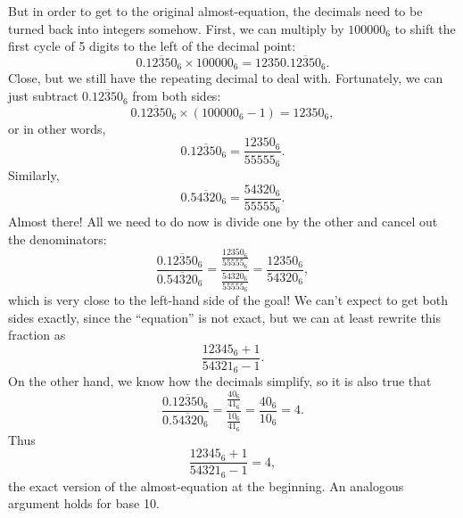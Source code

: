 \documentclass{article}
\begin{document}
But in order to get to the original almost-equation,
the decimals need to be turned back into integers somehow.
First, we can multiply by $100000_6$
to shift the first cycle of 5 digits to the left of the decimal point:
\[0.\overline{12350}_6 \times 100000_6 = 12350.\overline{12350}_6.\]
Close, but we still have the repeating decimal to deal with.
Fortunately, we can just subtract $0.\overline{12350}_6$ from both sides:
\[0.\overline{12350}_6 \times (100000_6-1) = 12350_6,\]
or in other words,
\[0.\overline{12350}_6 = \frac{12350_6}{55555_6}.\]
Similarly,
\[0.\overline{54320}_6 = \frac{54320_6}{55555_6}.\]
Almost there! All we need to do now is divide one by the other
and cancel out the denominators:
\[\frac{0.\overline{12350}_6}{0.\overline{54320}_6}=
\frac{\frac{12350_6}{55555_6}}{\frac{54320_6}{55555_6}}
=\frac{12350_6}{54320_6},\]
which is very close to the left-hand side of the goal!
We can't expect to get both sides exactly,
since the ``equation'' is not exact,
but we can at least rewrite this fraction as
\[\frac{12345_6+1}{54321_6-1}.\]
On the other hand,
we know how the decimals simplify,
so it is also true that
\[\frac{0.\overline{12350}_6}{0.\overline{54320}_6}
=\frac{\frac{40_6}{41_6}}{\frac{10_6}{41_6}}=\frac{40_6}{10_6}=4.\]
Thus
\[\frac{12345_6+1}{54321_6-1}=4,\]
the exact version of the almost-equation at the beginning.
An analogous argument holds for base 10.


\end{document}
